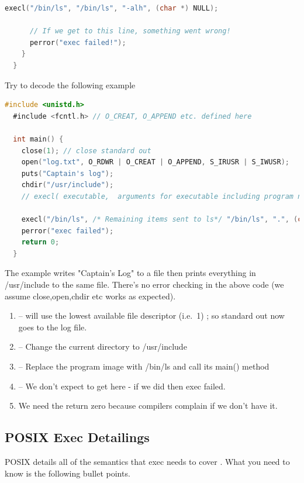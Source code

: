 \begin{itemize}
\begin{lstlisting}[language=C]
      execl("/bin/ls", "/bin/ls", "-alh", (char *) NULL);

      // If we get to this line, something went wrong!
      perror("exec failed!");
    }
  }
\end{lstlisting}

Try to decode the following example

\begin{lstlisting}[language=C]
  #include <unistd.h>
  #include <fcntl.h> // O_CREAT, O_APPEND etc. defined here

  int main() {
    close(1); // close standard out
    open("log.txt", O_RDWR | O_CREAT | O_APPEND, S_IRUSR | S_IWUSR);
    puts("Captain's log");
    chdir("/usr/include");
    // execl( executable,  arguments for executable including program name and NULL at the end)

    execl("/bin/ls", /* Remaining items sent to ls*/ "/bin/ls", ".", (char *) NULL); // "ls ."
    perror("exec failed");
    return 0;
  }
\end{lstlisting}

The example writes "Captain's Log" to a file then prints everything in /usr/include to the same file.
There's no error checking in the above code (we assume close,open,chdir etc works as expected).

\begin{enumerate}
\item {} -- will use the lowest available file descriptor (i.e.~1) ; so standard out now goes to the log file.
\item {} -- Change the current directory to /usr/include
\item {} -- Replace the program image with /bin/ls and call its main() method
\item {} -- We don't expect to get here - if we did then exec failed.
\item We need the return zero because compilers complain if we don't have it.
\end{enumerate}

\subsection{POSIX Exec Detailings}

POSIX details all of the semantics that exec needs to cover \cite{exec_2018}.
What you need to know is the following bullet points.


\end{itemize}
